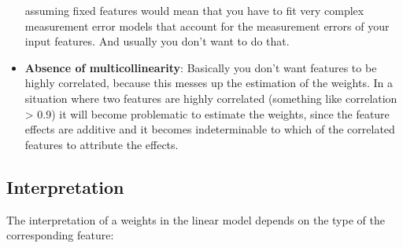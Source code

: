 \documentclass[12pt,]{krantz}
\theoremstyle{definition}
\theoremstyle{definition}
\theoremstyle{definition}
\theoremstyle{remark}
\begin{document}
\begin{itemize}
  assuming fixed features would mean that you have to fit very complex
  measurement error models that account for the measurement errors of
  your input features. And usually you don't want to do that.
\item
  \textbf{Absence of multicollinearity}: Basically you don't want
  features to be highly correlated, because this messes up the
  estimation of the weights. In a situation where two features are
  highly correlated (something like correlation \textgreater{} 0.9) it
  will become problematic to estimate the weights, since the feature
  effects are additive and it becomes indeterminable to which of the
  correlated features to attribute the effects.
\end{itemize}

\subsection{Interpretation}\label{interpretation}

The interpretation of a weights in the linear model depends on the type
of the corresponding feature:
\end{document}
